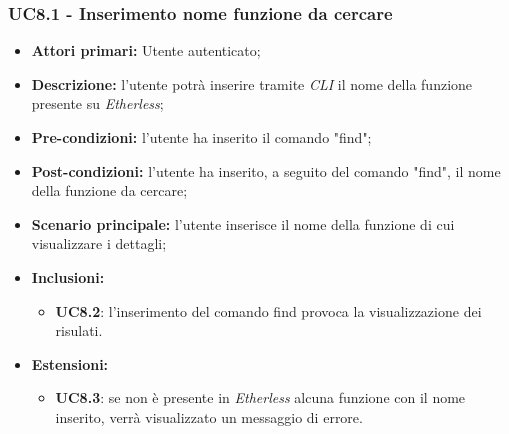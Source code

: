 \subsubsection{UC8.1 - Inserimento nome funzione da cercare}
\begin{itemize}
	\item \textbf{Attori primari:} Utente autenticato;
	\item \textbf{Descrizione:} l'utente potrà inserire tramite \textit{CLI\glo} il nome della funzione presente su \textit{Etherless};
	\item \textbf{Pre-condizioni:} l'utente ha inserito il comando "find";
	\item \textbf{Post-condizioni:} l'utente ha inserito, a seguito del comando "find", il nome della funzione da cercare;
	\item \textbf{Scenario principale:} l'utente inserisce il nome della funzione di cui visualizzare i dettagli;
    \item \textbf{Inclusioni:}
    \begin{itemize}
		\item \textbf{UC8.2}: l'inserimento del comando find provoca la visualizzazione dei risulati.
	\end{itemize}
	\item \textbf{Estensioni:}
	\begin{itemize}
		\item \textbf{UC8.3}: se non è presente in \textit{Etherless} alcuna funzione con il nome inserito, verrà visualizzato un messaggio di errore.
	\end{itemize}
\end{itemize}
